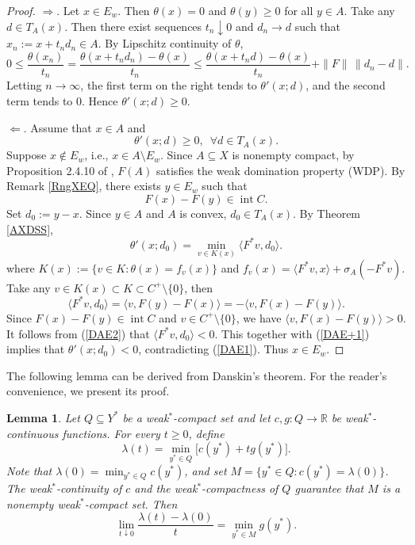 \documentclass[11pt]{article}
\newtheorem{lemma}{Lemma}[section]
\begin{document}
\begin{proof}
	  $ \Rightarrow $.
		Let $x\in E_w$. Then $\theta(x)=0$ and $\theta(y)\ge 0$ for all $y\in A$. Take any $d\in T_A(x)$. Then there exist sequences $t_n\downarrow0$ and $d_n\to d$ such that $x_n:=x+t_n d_n\in A$. By Lipschitz continuity of $\theta$,
	\[
	0\le\frac{\theta(x_n)}{t_n}= \frac{\theta(x+t_n d_n)-\theta(x)}{t_n}
	\le \frac{\theta(x+t_n d)-\theta(x)}{t_n}+\|F\|\,\|d_n-d\|.
	\]
	Letting $n\to\infty$, the first term on the right tends to $\theta'(x;d)$, and the second term tends to $0$. Hence $\theta'(x;d)\ge 0$.  
	
	$ \Leftarrow $. 
 Assume that $x\in A$  and
	\begin{equation}\label{DAE1}
		\theta'(x;d)\ge 0,\ \; \forall d\in T_A(x).
	\end{equation}
	Suppose $x \notin E_w$, i.e., $x\in A\setminus E_w$. Since $A \subseteq X$ is nonempty compact, by Proposition 2.4.10 of \cite{Luc}, $F(A)$ satisfies the weak domination property (WDP).  By   Remark \ref{RngXEQ},     there exists $y\in E_w$ such that
	\[
	F(x)-F(y)\in\operatorname{int}C .
	\]
	Set $d_0:=y-x$. Since $y\in A$ and $A$ is convex, $d_0 \in T_A(x)$. By Theorem \ref{AXDSS},
	\begin{equation}\label{DAE+1}
	\theta'(x;d_0)=\min_{v\in K(x)}\langle F^*v,d_0 \rangle .
	\end{equation}
	where $K(x):=\{v\in K:\theta(x)=f_v(x)\}$  and   $f_v(x)= \langle F^*v,x\rangle+\sigma_A(-F^*v)$.
	Take any $v\in K(x)\subset K\subset C^+\setminus\{0\}$,  then
\begin{equation}\label{DAE2}
	\langle F^*v,d_0 \rangle=\langle v,F(y)-F(x)\rangle=-\langle v,F(x)-F(y)\rangle .
	\end{equation}
	Since $F(x)-F(y)\in\operatorname{int}C$ and $v\in C^+\setminus\{0\}$, we have $\langle v,F(x)-F(y)\rangle>0$. It follows from  (\ref{DAE2})  that $\langle F^*v,d_0 \rangle<0$. This together with   (\ref{DAE+1}) implies that  $\theta'(x;d_0)<0$, contradicting (\ref{DAE1}). Thus $x\in E_w$.  
\end{proof}


The following lemma can be derived from Danskin's theorem. For the reader's convenience, we present its proof.
 


\begin{lemma}  \label{LXcEQ} 
	Let $Q \subseteq Y^*$ be a weak$^*$-compact set and let $c, g : Q \to \mathbb{R}$ be weak$^*$-continuous functions. For every $t \ge 0$, define
	\[
	\lambda(t) = \min_{y^* \in Q} \bigl[ c(y^*) + t g(y^*) \bigr].
	\]
	Note that $\lambda(0) = \min_{y^*\in Q} c(y^*)$, and set
	$M = \{ y^* \in Q : c(y^*) = \lambda(0) \}$.
	The weak$^*$-continuity of $c$ and the weak$^*$-compactness of $Q$ guarantee that $M$ is a nonempty weak$^*$-compact set.
	Then
	\[
	\lim_{t \downarrow 0} \frac{\lambda(t) - \lambda(0)}{t} = \min_{y^* \in M} g(y^*).
	\]
\end{lemma}
\end{document}

